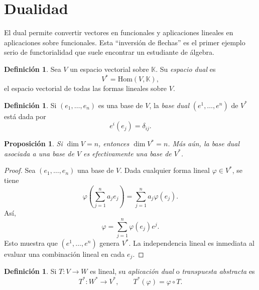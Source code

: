 \documentclass[10pt,a4paper,oneside]{article}
\theoremstyle{plain}
\newtheorem{proposition}[theorem]{Proposición}
\theoremstyle{definition}
\newtheorem{definition}[theorem]{Definición}
\theoremstyle{remark}
\newcommand{\K}{\mathbb{K}}
\newcommand{\Hom}{\mathrm{Hom}}
\begin{document}
\section{Dualidad}
\begin{ideaBox}
El dual permite convertir vectores en funcionales y aplicaciones lineales en aplicaciones sobre funcionales. Esta ``inversión de flechas'' es el primer ejemplo serio de functorialidad que suele encontrar un estudiante de álgebra.
\end{ideaBox}
\begin{definition}
Sea \(V\) un espacio vectorial sobre \(\K\). Su \emph{espacio dual} es
\[
V^*=\Hom(V,\K),
\]
el espacio vectorial de todas las formas lineales sobre \(V\).
\end{definition}

\begin{definition}
Si \((e_1,\dots,e_n)\) es una base de \(V\), la \emph{base dual} \((e^1,\dots,e^n)\) de \(V^*\) está dada por
\[
e^i(e_j)=\delta_{ij}.
\]
\end{definition}

\begin{proposition}
Si \(\dim V=n\), entonces \(\dim V^*=n\). Más aún, la base dual asociada a una base de \(V\) es efectivamente una base de \(V^*\).
\end{proposition}

\begin{proof}
Sea \((e_1,\dots,e_n)\) una base de \(V\). Dada cualquier forma lineal \(\varphi\in V^*\), se tiene
\[
\varphi\!\left(\sum_{j=1}^n a_j e_j\right)=\sum_{j=1}^n a_j \varphi(e_j).
\]
Así,
\[
\varphi=\sum_{j=1}^n \varphi(e_j)e^j.
\]
Esto muestra que \((e^1,\dots,e^n)\) genera \(V^*\). La independencia lineal es inmediata al evaluar una combinación lineal en cada \(e_j\). \end{proof}

\begin{definition}
Si \(T:V\to W\) es lineal, su \emph{aplicación dual} o \emph{transpuesta abstracta} es
\[
T^*:W^*\to V^*,
\qquad
T^*(\varphi)=\varphi\circ T.
\]
\end{definition}

\begin{center}
\end{center}
\end{document}
